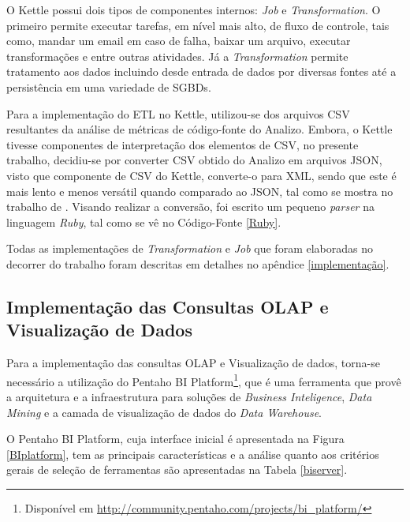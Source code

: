 O Kettle possui dois tipos de componentes internos: \textit{Job} e \textit{Transformation}. O primeiro permite executar tarefas, em nível mais alto, de fluxo de controle, tais como, mandar um email em caso de falha, baixar um arquivo, executar transformações  e entre outras atividades. Já a \textit{Transformation} permite tratamento aos dados incluindo desde entrada de dados por diversas fontes até a persistência em uma variedade de SGBDs.


Para a implementação do ETL no Kettle, utilizou-se dos arquivos CSV resultantes da análise de métricas de código-fonte do Analizo. Embora, o Kettle tivesse componentes de interpretação dos elementos de CSV, no presente trabalho, decidiu-se por converter CSV obtido do Analizo em arquivos JSON, visto que componente de CSV do Kettle, converte-o para XML, sendo que este é mais lento e menos versátil quando comparado ao JSON, tal como se mostra no trabalho de . Visando realizar a conversão, foi escrito um pequeno \textit{parser} na linguagem \textit{Ruby}, tal como se vê no Código-Fonte \ref{Ruby}.

\begin{center}
\begin{minipage}{0.5\textwidth}

\end{minipage}
\end{center}

Todas as implementações de \textit{Transformation} e \textit{Job} que foram elaboradas no decorrer do trabalho foram descritas em detalhes no apêndice \ref{implementação}.


\subsection{Implementação das Consultas OLAP e Visualização de Dados}

Para a implementação das consultas OLAP e Visualização de dados, torna-se necessário a utilização do Pentaho BI Platform\footnote{Disponível em \url{http://community.pentaho.com/projects/bi_platform/}}, que é uma ferramenta que provê a arquitetura e a infraestrutura para soluções de \textit{Business Inteligence}, \textit{Data Mining} e a camada de visualização de dados do \textit{Data Warehouse}.


O Pentaho BI Platform, cuja interface inicial é apresentada na Figura \ref{BIplatform}, tem as principais características e a análise quanto aos critérios gerais de seleção de ferramentas são apresentadas na Tabela \ref{biserver}. 


